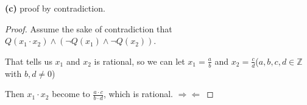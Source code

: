\documentclass[12pt]{article}
\begin{document}
\bigbreak
\noindent \textbf{(c)}
\smallbreak
proof by contradiction.

\begin{proof}
Assume the sake of contradiction that $Q(x_1 \cdot x_2) \land (\lnot Q(x_1) \land \lnot Q(x_2))$.

That tells us $x_1$ and $x_2$ is rational, so we can let $x_1 = \frac{a}{b}$ and $x_2 = \frac{c}{d}$($a, b, c, d \in \mathbb{Z}$ with $b, d \neq 0$)

Then $x_1 \cdot x_2$ become to $\frac{a \cdot c}{b \cdot d}$, which is rational. $\Rightarrow\!\Leftarrow$
\end{proof}
\end{document}
